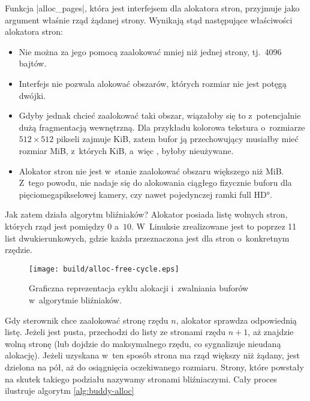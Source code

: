 Funkcja \code|alloc_pages|, która jest interfejsem dla alokatora
stron, przyjmuje jako argument właśnie rząd żądanej strony.  Wynikają
stąd następujące właściwości alokatora stron:

\begin{itemize}
\item Nie można za jego pomocą zaalokować mniej niż jednej strony,
  tj.\ 4096 bajtów.
\item Interfejs nie pozwala alokować obszarów, których rozmiar nie
  jest potęgą dwójki.
\item Gdyby jednak chcieć zaalokować taki obszar, wiązałoby się to
  z~potencjalnie dużą fragmentacją wewnętrzną.  Dla przykładu kolorowa
  tekstura o~rozmiarze $512 \times 512$ pikseli zajmuje
  \unit[768]{KiB}, zatem bufor ją przechowujący musiałby mieć rozmiar
  \unit[1]{MiB}, z~których \unit[256]{KiB}, a~więc ,
  byłoby nieużywane.
\item Alokator stron nie jest w~stanie zaalokować obszaru większego
  niż \unit[4]{MiB}.  Z~tego powodu, nie nadaje się do alokowania
  ciągłego fizycznie buforu dla pięciomegapikselowej kamery, czy nawet
  pojedynczej ramki \ang*{full HD}.
\end{itemize}

Jak zatem działa algorytm bliźniaków?  Alokator posiada listę wolnych
stron, których rząd jest pomiędzy $0$ a~$10$.  W~Linuksie zrealizowane
jest to poprzez 11 list dwukierunkowych, gdzie każda przeznaczona jest
dla stron o~konkretnym rzędzie.

\begin{wrapfigure}{o}[1cm]{0.3\textwidth}
\begin{center}
\texttt{[image: build/alloc-free-cycle.eps]}
\end{center}
\caption[Zarządzanie pamięcią w~algorytmie bliźniaków]{Graficzna
  reprezentacja cyklu alokacji i~zwalniania buforów w~algorytmie
  bliźniaków.}
\end{wrapfigure}

Gdy sterownik chce zaalokować stronę rzędu $n$, alokator sprawdza
odpowiednią listę.  Jeżeli jest pusta, przechodzi do listy ze stronami
rzędu $n+1$, aż znajdzie wolną stronę (lub dojdzie do maksymalnego
rzędu, co sygnalizuje nieudaną alokację).  Jeżeli uzyskana w~ten
sposób strona ma rząd większy niż żądany, jest dzielona na pół, aż do
osiągnięcia oczekiwanego rozmiaru.  Strony, które powstały na skutek
takiego podziału nazywamy stronami bliźniaczymi.  Cały proces
ilustruje algorytm \ref{alg:buddy-alloc}

